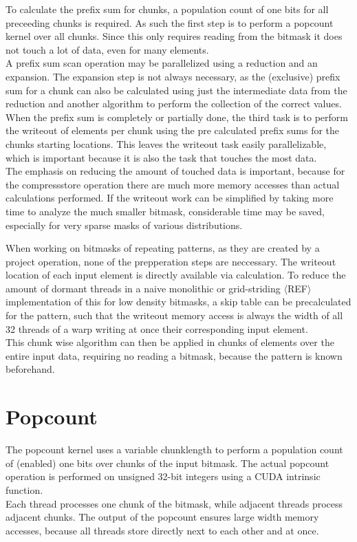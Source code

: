 \documentclass{tudscrreprt}
\newcommand{\markr}[1]{\textcolor{review}{$\langle$#1$\rangle$}}
\begin{document}
		To calculate the prefix sum for chunks, a population count of one bits for all preceeding chunks is required. As such the first step is to perform a popcount kernel over all chunks. Since this only requires reading from the bitmask it does not touch a lot of data, even for many elements. \\
		
		A prefix sum scan operation may be parallelized using a reduction and an expansion. The expansion step is not always necessary, as the (exclusive) prefix sum for a chunk can also be calculated using just the intermediate data from the reduction and another algorithm to perform the collection of the correct values. \\
		
		When the prefix sum is completely or partially done, the third task is to perform the writeout of elements per chunk using the pre calculated prefix sums for the chunks starting locations. This leaves the writeout task easily parallelizable, which is important because it is also the task that touches the most data. \\
		
		The emphasis on reducing the amount of touched data is important, because for the compressstore operation there are much more memory accesses than actual calculations performed. If the writeout work can be simplified by taking more time to analyze the much smaller bitmask, considerable time may be saved, especially for very sparse masks of various distributions.
	
		When working on bitmasks of repeating patterns, as they are created by a project operation, none of the prepperation steps are neccessary. The writeout location of each input element is directly available via calculation. To reduce the amount of dormant threads in a naive monolithic or grid-striding \markr{REF} implementation of this for low density bitmasks, a skip table can be precalculated for the pattern, such that the writeout memory access is always the width of all 32 threads of a warp writing at once their corresponding input element. \\
		This chunk wise algorithm can then be applied in chunks of elements over the entire input data, requiring no reading a bitmask, because the pattern is known beforehand. \\
	
		\section{Popcount}
			The popcount kernel uses a variable chunklength to perform a population count of (enabled) one bits over chunks of the input bitmask. The actual popcount operation is performed on unsigned 32-bit integers using a CUDA intrinsic function. \\
			Each thread processes one chunk of the bitmask, while adjacent threads process adjacent chunks. The output of the popcount ensures large width memory accesses, because all threads store directly next to each other and at once. \\
			
\end{document}
